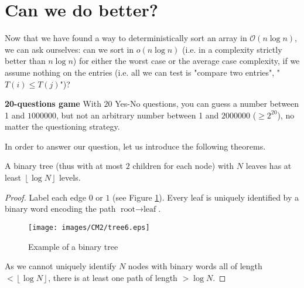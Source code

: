 \section{Can we do better?}

Now that we have found a way to deterministically sort an array in $\mathcal{O}(n\log n)$, we can ask ourselves: can we sort in $o(n \log n)$ (i.e. in a complexity strictly better than $n \log n$) for either the worst case or the average case complexity, if we assume nothing on the entries (i.e. all we can test is "compare two entries", "$T(i) \leq T(j)$")?\\

\begin{example}
\begin{leftbar}
\textbf{20-questions game} With $20$ Yes-No questions, you can guess a number between 1 and $1000000$, but not an arbitrary number between 1 and $2000000$ ($\geq 2^{20}$), no matter the questioning strategy.
\end{leftbar}
\end{example}

In order to answer our question, let us introduce the following theorems.\\

\begin{theorem}
A binary tree (thus with at most $2$ children for each node) with $N$ leaves has at least $\left\lfloor \log N \right\rfloor$ levels.
\end{theorem}
\begin{proof}
Label each edge $0$ or $1$ (see Figure \ref{tree6}). Every leaf is uniquely identified by a binary word encoding the path $\text{root} \rightarrow \text{leaf}$.\\
\begin{figure}[htbp]
\centering
\texttt{[image: images/CM2/tree6.eps]}
\caption{Example of a binary tree}
\label{tree6}
\end{figure}
As we cannot uniquely identify $N$ nodes with binary words all of length $< \left\lfloor \log N \right\rfloor$, there is at least one path of length $> \log N$.

\end{proof}

